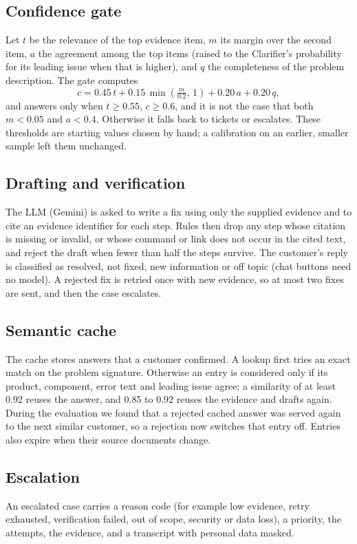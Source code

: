 \documentclass[cameraready]{ieeeconf}
\begin{document}
\subsection{Confidence gate}
Let $t$ be the relevance of the top evidence item, $m$ its margin over the second item, $a$ the agreement among the top items (raised to the Clarifier's probability for its leading issue when that is higher), and $q$ the completeness of the problem description. The gate computes
\begin{equation}
c = 0.45\,t + 0.15\,\min\!\left(\tfrac{m}{0.2},\,1\right) + 0.20\,a + 0.20\,q ,
\label{eq:gate}
\end{equation}
and answers only when $t\ge 0.55$, $c\ge 0.6$, and it is not the case that both $m<0.05$ and $a<0.4$. Otherwise it falls back to tickets or escalates. These thresholds are starting values chosen by hand; a calibration on an earlier, smaller sample left them unchanged.

\subsection{Drafting and verification}
The LLM (Gemini) is asked to write a fix using only the supplied evidence and to cite an evidence identifier for each step. Rules then drop any step whose citation is missing or invalid, or whose command or link does not occur in the cited text, and reject the draft when fewer than half the steps survive. The customer's reply is classified as resolved, not fixed, new information or off topic (chat buttons need no model). A rejected fix is retried once with new evidence, so at most two fixes are sent, and then the case escalates.

\subsection{Semantic cache}
The cache stores answers that a customer confirmed. A lookup first tries an exact match on the problem signature. Otherwise an entry is considered only if its product, component, error text and leading issue agree; a similarity of at least 0.92 reuses the answer, and 0.85 to 0.92 reuses the evidence and drafts again. During the evaluation we found that a rejected cached answer was served again to the next similar customer, so a rejection now switches that entry off. Entries also expire when their source documents change.

\subsection{Escalation}
An escalated case carries a reason code (for example low evidence, retry exhausted, verification failed, out of scope, security or data loss), a priority, the attempts, the evidence, and a transcript with personal data masked.
\end{document}
